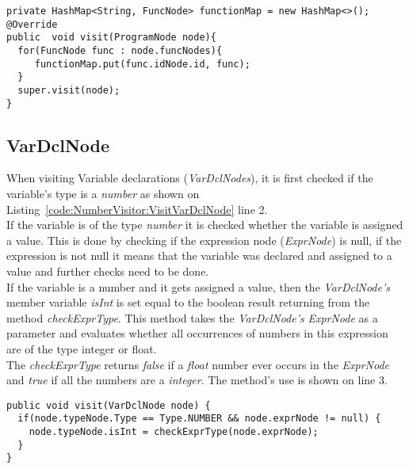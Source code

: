 \begin{lstlisting}[caption={code to implement the ProgramNode visitor and function map}, label={code:NumberVisitor:VisitProgramNode}]
private HashMap<String, FuncNode> functionMap = new HashMap<>();
@Override
public  void visit(ProgramNode node){
  for(FuncNode func : node.funcNodes){
     functionMap.put(func.idNode.id, func);
  }
  super.visit(node);
}
\end{lstlisting}
\subsection{VarDclNode}
When visiting Variable declarations (\textit{VarDclNodes}), it is first checked if the variable's type is a \textit{number} as shown on Listing~\ref{code:NumberVisitor:VisitVarDclNode} line 2. 
\\
If the variable is of the type \textit{number} it is checked whether the variable is assigned a value. This is done by checking if the expression node (\textit{ExprNode}) is null, if the expression is not null it means that the variable was declared and assigned to a value and further checks need to be done.
\\
If the variable is a number and it gets assigned a value, then the \textit{VarDclNode's} member variable \textit{isInt} is set equal to the boolean result returning from the method \textit{checkExprType}. This method takes the \textit{VarDclNode's} \textit{ExprNode} as a parameter and evaluates whether all occurrences of numbers in this expression are of the type integer or float.
\\
The \textit{checkExprType} returns \textit{false} if a \textit{float} number ever occurs in the \textit{ExprNode} and \textit{true} if all the numbers are a \textit{integer}. The method's use is shown on line 3.

\begin{lstlisting}[caption={code to implement the VarDclNode visitor}, label={code:NumberVisitor:VisitVarDclNode}]
public void visit(VarDclNode node) {
  if(node.typeNode.Type == Type.NUMBER && node.exprNode != null) {
    node.typeNode.isInt = checkExprType(node.exprNode);
  }
}
\end{lstlisting}

